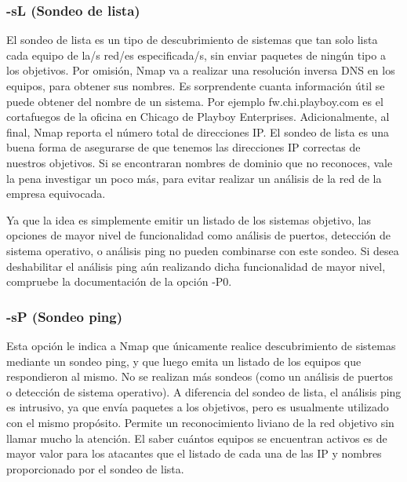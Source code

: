 \documentclass[a4paper, 11pt, titlepage]{book}
\begin{document}
            \subsubsection{-sL (Sondeo de lista)} El sondeo de lista es un tipo de descubrimiento
            de sistemas que tan solo lista cada equipo de la/s red/es especificada/s, sin enviar paquetes 
            de ningún tipo a los objetivos. Por omisión, Nmap va a realizar una resolución inversa DNS en 
            los equipos, para obtener sus nombres. Es sorprendente cuanta información útil se puede obtener 
            del nombre de un sistema. Por ejemplo fw.chi.playboy.com es el cortafuegos de la oficina en 
            Chicago de Playboy Enterprises. Adicionalmente, al final, Nmap reporta el número total de 
            direcciones IP. El sondeo de lista es una buena forma de asegurarse de que tenemos las 
            direcciones IP correctas de nuestros objetivos. Si se encontraran nombres de dominio que no 
            reconoces, vale la pena investigar un poco más, para evitar realizar un análisis de la red 
            de la empresa equivocada.

            Ya que la idea es simplemente emitir un listado de los sistemas objetivo, las opciones de 
            mayor nivel de funcionalidad como análisis de puertos, detección de sistema operativo, o 
            análisis ping no pueden combinarse con este sondeo. Si desea deshabilitar el análisis ping 
            aún realizando dicha funcionalidad de mayor nivel, compruebe la documentación de la opción -P0.

            \subsubsection{-sP (Sondeo ping)} Esta opción le indica a Nmap que únicamente realice 
            descubrimiento de sistemas mediante un sondeo ping, y que luego emita un listado de los equipos 
            que respondieron al mismo. No se realizan más sondeos (como un análisis de puertos o detección 
            de sistema operativo). A diferencia del sondeo de lista, el análisis ping es intrusivo, ya que 
            envía paquetes a los objetivos, pero es usualmente utilizado con el mismo propósito. Permite 
            un reconocimiento liviano de la red objetivo sin llamar mucho la atención. El saber cuántos 
            equipos se encuentran activos es de mayor valor para los atacantes que el listado de cada una 
            de las IP y nombres proporcionado por el sondeo de lista.
\end{document}
